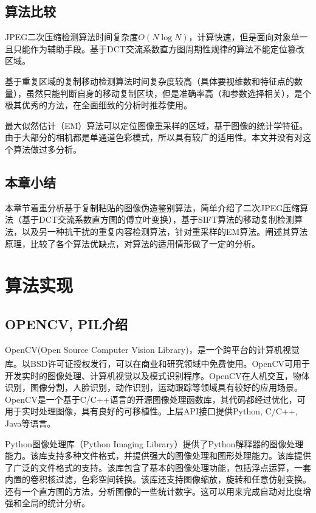 \documentclass[a4paper, 10pt, notitlepage]{report}
\newcommand{\supercite}[1]{\textsuperscript{\cite{#1}}}
\begin{document}
	\section{算法比较}
		JPEG二次压缩检测算法时间复杂度$O(N \log N)$，计算快速，但是面向对象单一且只能作为辅助手段。基于DCT交流系数直方图周期性规律的算法不能定位篡改区域。

		基于重复区域的复制移动检测算法时间复杂度较高（具体要视维数和特征点的数量），虽然只能判断自身的移动复制区块，但是准确率高（和参数选择相关），是个极其优秀的方法，在全面细致的分析时推荐使用。

		最大似然估计（EM）算法可以定位图像重采样的区域，基于图像的统计学特征。由于大部分的相机都是单通道色彩模式，所以具有较广的适用性。本文并没有对这个算法做过多分析。


	\section{本章小结}
		本章节着重分析基于复制粘贴的图像伪造鉴别算法，简单介绍了二次JPEG压缩算法（基于DCT交流系数直方图的傅立叶变换），基于SIFT算法的移动复制检测算法，以及另一种抗干扰的重复内容检测算法，针对重采样的EM算法。阐述其算法原理，比较了各个算法优缺点，对算法的适用情形做了一定的分析。


\chapter{算法实现}
	\section{OPENCV, PIL介绍}
		OpenCV(Open Source Computer Vision Library)，是一个跨平台的计算机视觉库\supercite{bradski2008learning, bradski2000opencv}。以BSD许可证授权发行，可以在商业和研究领域中免费使用。OpenCV可用于开发实时的图像处理、计算机视觉以及模式识别程序。OpenCV在人机交互，物体识别，图像分割，人脸识别，动作识别，运动跟踪等领域具有较好的应用场景。OpenCV是一个基于C/C++语言的开源图像处理函数库，其代码都经过优化，可用于实时处理图像，具有良好的可移植性。上层API接口提供Python, C/C++, Java等语言。

		Python图像处理库（Python Imaging Library）提供了Python解释器的图像处理能力。该库支持多种文件格式，并提供强大的图像处理和图形处理能力。该库提供了广泛的文件格式的支持。该库包含了基本的图像处理功能，包括浮点运算，一套内置的卷积核过滤，色彩空间转换。该库还支持图像缩放，旋转和任意仿射变换。还有一个直方图的方法，分析图像的一些统计数字。这可以用来完成自动对比度增强和全局的统计分析。
\end{document}
